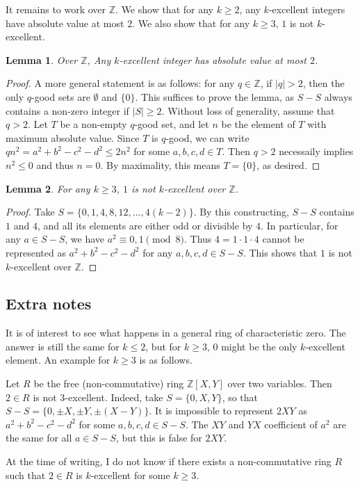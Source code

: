\documentclass{article}
\newcommand{\Z}{\mathbb{Z}}
\newtheorem{lemma}{Lemma}
\begin{document}
It remains to work over $\Z$.
We show that for any $k \geq 2$, any $k$-excellent integers have absolute value at most $2$.
We also show that for any $k \geq 3$, $1$ is not $k$-excellent.

\begin{lemma}\label{2017a2-5}
Over $\Z$, Any $k$-excellent integer has absolute value at most $2$.
\end{lemma}
\begin{proof}
A more general statement is as follows: for any $q \in \Z$, if $|q| > 2$, then the only $q$-good sets are $\emptyset$ and $\{0\}$.
This suffices to prove the lemma, as $S - S$ always contains a non-zero integer if $|S| \geq 2$.
Without loss of generality, assume that $q > 2$.
Let $T$ be a non-empty $q$-good set, and let $n$ be the element of $T$ with maximum absolute value.
Since $T$ is $q$-good, we can write $qn^2 = a^2 + b^2 - c^2 - d^2 \leq 2n^2$ for some $a, b, c, d \in T$.
Then $q > 2$ necessaily implies $n^2 \leq 0$ and thus $n = 0$.
By maximality, this means $T = \{0\}$, as desired.
\end{proof}

\begin{lemma}\label{2017a2-6}
For any $k \geq 3$, $1$ is not $k$-excellent over $\Z$.
\end{lemma}
\begin{proof}
Take $S = \{0, 1, 4, 8, 12, \ldots, 4(k - 2)\}$.
By this constructing, $S - S$ contains $1$ and $4$, and all its elements are either odd or divisible by $4$.
In particular, for any $a \in S - S$, we have $a^2 \equiv 0, 1 \pmod{8}$.
Thus $4 = 1 \cdot 1 \cdot 4$ cannot be represented as $a^2 + b^2 - c^2 - d^2$ for any $a, b, c, d \in S - S$.
This shows that $1$ is not $k$-excellent over $\Z$.
\end{proof}



\subsection*{Extra notes}

It is of interest to see what happens in a general ring of characteristic zero.
The answer is still the same for $k \leq 2$, but for $k \geq 3$, $0$ might be the only $k$-excellent element.
An example for $k \geq 3$ is as follows.

Let $R$ be the free (non-commutative) ring $\Z[X, Y]$ over two variables.
Then $2 \in R$ is not $3$-excellent.
Indeed, take $S = \{0, X, Y\}$, so that $S - S = \{0, \pm X, \pm Y, \pm (X - Y)\}$.
It is impossible to represent $2XY$ as $a^2 + b^2 - c^2 - d^2$ for some $a, b, c, d \in S - S$.
The $XY$ and $YX$ coefficient of $a^2$ are the same for all $a \in S - S$, but this is false for $2XY$.

At the time of writing, I do not know if there exists a non-commutative ring $R$ such that $2 \in R$ is $k$-excellent for some $k \geq 3$.
\end{document}
